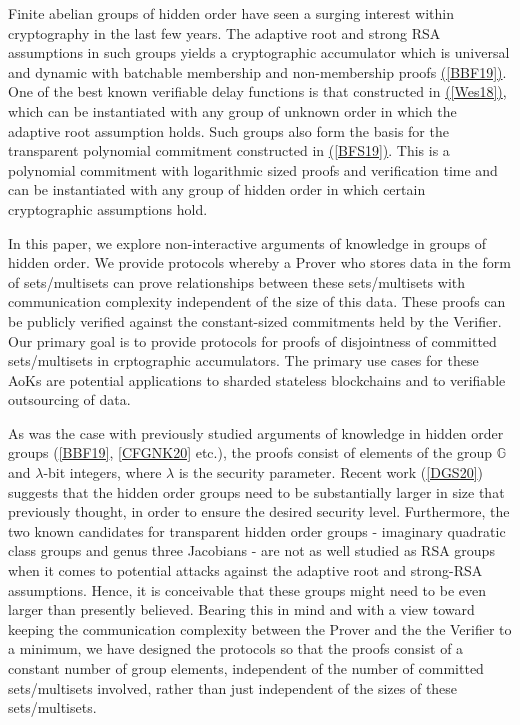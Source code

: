 \documentclass[11pt, lettersize, notitlepage, leqno, footskip=0.6cm]{article}
\newcommand{\mb}{\mathbb}
\newcommand{\lam}{\lambda}
\numberwithin{equation}{section}
\begin{document}
Finite abelian groups of hidden order have seen a surging interest within cryptography in the last few years. The adaptive root and strong RSA assumptions in such groups yields a cryptographic accumulator which is universal and dynamic with batchable membership and non-membership proofs \hyperlink{BBF19}{([BBF19])}. One of the best known verifiable delay functions is that constructed in \hyperlink{Wes18}{([Wes18])}, which can be instantiated with any group of unknown order in which the adaptive root assumption holds. Such groups also form the basis for the transparent polynomial commitment constructed in \hyperlink{BFS19}{([BFS19])}. This is a polynomial commitment with logarithmic sized proofs and verification time and can be instantiated with any group of hidden order in which certain cryptographic assumptions hold.

In this paper, we explore non-interactive arguments of knowledge in groups of hidden order. We provide protocols whereby a Prover who stores data in the form of sets/multisets can prove relationships between these sets/multisets with communication complexity independent of the size of this data. These proofs can be publicly verified against the constant-sized commitments held by the Verifier. Our primary goal is to provide protocols for proofs of disjointness of committed sets/multisets in crptographic accumulators. The primary use cases for these AoKs are potential applications to sharded stateless blockchains and to verifiable outsourcing of data.

As was the case with previously studied arguments of knowledge in hidden order groups (\hyperlink{BBF19}{[BBF19]}, \hyperlink{CFGKN20}{[CFGNK20]} etc.), the proofs consist of elements of the group $\mb{G}$ and $\lam$-bit integers, where $\lam$ is the security parameter. Recent work (\hyperlink{DGS20}{[DGS20]}) suggests that the hidden order groups need to be substantially larger in size that previously thought, in order to ensure the desired security level. Furthermore, the two known candidates for transparent hidden order groups - imaginary quadratic class groups and genus three Jacobians - are not as well studied as RSA groups when it comes to potential attacks against the adaptive root and strong-RSA assumptions. Hence, it is conceivable that these groups might need to be even larger than presently believed. Bearing this in mind and with a view toward keeping the communication complexity between the Prover and the the Verifier to a minimum, we have designed the protocols so that the proofs consist of a constant number of group elements, independent of the number of committed sets/multisets involved, rather than just independent of the sizes of these sets/multisets. %
\end{document}
